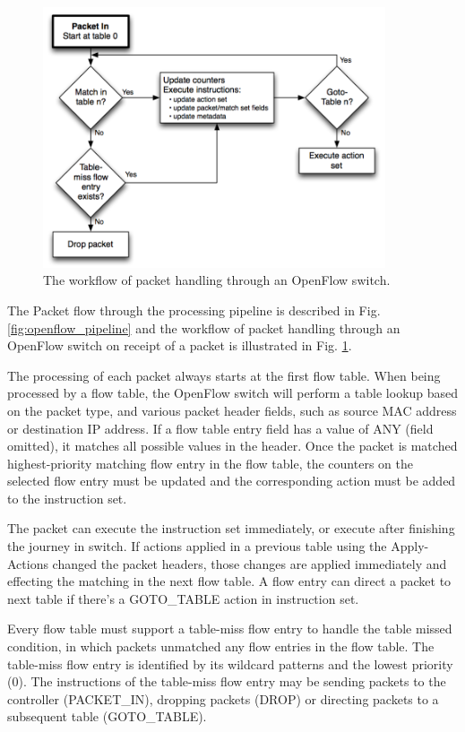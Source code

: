 \begin{figure}[!ht]
\centering
\includegraphics[width=0.9\textwidth]{./fig/openflow_matching}
\caption{The workflow of packet handling through an OpenFlow switch. \cite{openflow-spec}}
\label{fig:openflow_matching}
\end{figure}

The Packet flow through the processing pipeline is described in Fig. \ref{fig:openflow_pipeline} and the workflow of packet handling through an OpenFlow switch on receipt of a packet is illustrated in Fig. \ref{fig:openflow_matching}.

The processing of each packet always starts at the first flow table.
When being processed by a flow table, the OpenFlow switch will perform a table lookup based on the packet type, and various packet header fields, such as source MAC address or destination IP address.
If a flow table entry field has a value of ANY (field omitted), it matches all possible values in the header.
Once the packet is matched highest-priority matching flow entry in the flow table, the counters on the selected flow entry must be updated and the corresponding action must be added to the instruction set.

The packet can execute the instruction set immediately, or execute after finishing the journey in switch.
If actions applied in a previous table using the Apply-Actions changed the packet headers, those changes are applied immediately and effecting the matching in the next flow table.
A flow entry can direct a packet to next table if there's a GOTO\_TABLE action in instruction set.

Every flow table must support a table-miss flow entry to handle the table missed condition, in which packets unmatched any flow entries in the flow table. The table-miss flow entry is identified by its wildcard patterns and the lowest priority (0). The instructions of the table-miss flow entry may be sending packets to the controller (PACKET\_IN), dropping packets (DROP) or directing packets to a subsequent table (GOTO\_TABLE).




